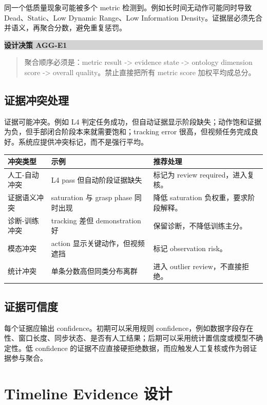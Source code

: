 \documentclass[UTF8,zihao=-4,oneside,openany]{ctexrep}
\newenvironment{decisionbox}[1]{\vspace{0.5em}\noindent\colorbox{LightGray}{\parbox{0.96\linewidth}{\textbf{#1}}}\par\vspace{-0.2em}\begin{quote}\small}{\end{quote}\vspace{0.3em}}
\begin{document}
同一个低质量现象可能被多个 metric 检测到。例如长时间无动作可能同时导致 Dead、Static、Low Dynamic Range、Low Information Density。证据层必须先合并语义，再聚合分数，避免重复惩罚。

\begin{decisionbox}{设计决策 AGG-E1}
聚合顺序必须是：metric result -> evidence state -> ontology dimension score -> overall quality。禁止直接把所有 metric score 加权平均成总分。
\end{decisionbox}

\subsection{证据冲突处理}

证据可能冲突。例如 L4 判定任务成功，但自动证据显示阶段缺失；动作饱和证据为负，但手部闭合阶段本来就需要饱和；tracking error 很高，但视频任务完成良好。系统应提供冲突标记，而不是强行平均。

\begin{longtable}{L{3.5cm} L{5cm} L{5.4cm}}
\toprule
冲突类型 & 示例 & 推荐处理 \\
\midrule
人工-自动冲突 & L4 pass 但自动阶段证据缺失 & 标记为 review required，进入复核。 \\
证据语义冲突 & saturation 与 grasp phase 同时出现 & 降低 saturation 负权重，要求阶段解释。 \\
诊断-训练冲突 & tracking 差但 demonstration 好 & 保留诊断，不降低训练主分。 \\
模态冲突 & action 显示关键动作，但视频遮挡 & 标记 observation risk。 \\
统计冲突 & 单条分数高但同类分布离群 & 进入 outlier review，不直接拒绝。 \\
\bottomrule
\end{longtable}

\subsection{证据可信度}

每个证据应输出 confidence。初期可以采用规则 confidence，例如数据字段存在性、窗口长度、同步状态、是否有人工结果；后期可以采用统计置信度或模型不确定性。低 confidence 的证据不应直接硬拒绝数据，而应触发人工复核或作为弱证据参与聚合。

\section{Timeline Evidence 设计}
\end{document}
